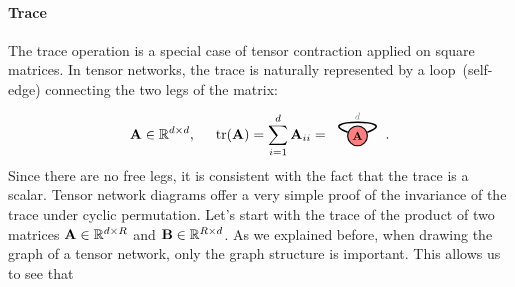 \paragraph{Trace} The trace operation is a special case of tensor contraction applied on square matrices. In tensor networks, the trace is naturally represented by a loop~(self-edge)  connecting the two legs of the matrix:
\begin{align*}
\Ab\in\RR^{d \times d},\hspace{0.5cm}
\tr(\Ab) = \sum_{i=1}^d\Ab_{ii} = \hspace*{-0.5cm}
\begin{tikzpicture}[baseline=\baseline]
   \tikzset{tensor/.style = {minimum size = 0.5cm,shape = circle,thick,draw=black,inner sep = 0pt}, edge/.style = {thick,line width=.4mm},every loop/.style={}}
    \def\y{0}
    \def\x{0}
    \node[tensor,fill=red!50!white] (A) at (\x,\y){\scalebox{0.85}{$\Ab$}};
    \draw[edge] (A) to [out=20,in=160, distance=1cm] (A);
    \node[draw=none] () at (\x,\y+0.5) {\scalebox{0.7}{\dimcolor{$d$}}};
    \end{tikzpicture}\hspace*{-0.5cm}.
\end{align*}
Since there are no free legs, it is consistent with the fact that the trace is a scalar. Tensor network diagrams offer a very simple proof of the invariance of the trace under cyclic permutation. Let's start with the trace of the product of two matrices $\mathbf{A} \in \mathbb{R}^{d\times R}$ and $\mathbf{B} \in \mathbb{R}^{R\times d}$.  As we explained before, when drawing the graph of a tensor network, only the graph structure is important. This allows us to see that
